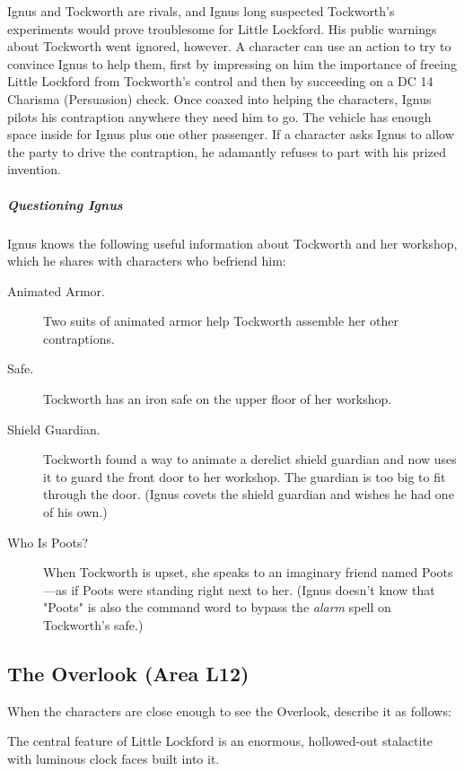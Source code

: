 \documentclass[10pt,a4paper,twoside,bg=print,twocolumn,openany,nodeprecatedcode]{dndbook}
\begin{document}
Ignus and Tockworth are rivals, and Ignus long suspected Tockworth's experiments would prove troublesome for Little Lockford. His public warnings about Tockworth went ignored, however. A character can use an action to try to convince Ignus to help them, first by impressing on him the importance of freeing Little Lockford from Tockworth's control and then by succeeding on a DC 14 Charisma (Persuasion) check. Once coaxed into helping the characters, Ignus pilots his contraption anywhere they need him to go. The vehicle has enough space inside for Ignus plus one other passenger. If a character asks Ignus to allow the party to drive the contraption, he adamantly refuses to part with his prized invention.

\subparagraph{Questioning Ignus}
Ignus knows the following useful information about Tockworth and her workshop, which he shares with characters who befriend him:


\begin{description}
\item[Animated Armor.]
Two suits of animated armor help Tockworth assemble her other contraptions.
\item[Safe.]
Tockworth has an iron safe on the upper floor of her workshop.
\item[Shield Guardian.]
Tockworth found a way to animate a derelict shield guardian and now uses it to guard the front door to her workshop. The guardian is too big to fit through the door. (Ignus covets the shield guardian and wishes he had one of his own.)
\item[Who Is Poots?]
When Tockworth is upset, she speaks to an imaginary friend named Poots—as if Poots were standing right next to her. (Ignus doesn't know that "Poots" is also the command word to bypass the \textit{alarm} spell on Tockworth's safe.)
\end{description}

\subsection{The Overlook (Area L12)}
When the characters are close enough to see the Overlook, describe it as follows:

\begin{DndReadAloud}{}
The central feature of Little Lockford is an enormous, hollowed-out stalactite with luminous clock faces built into it.

\end{DndReadAloud}
\end{document}

